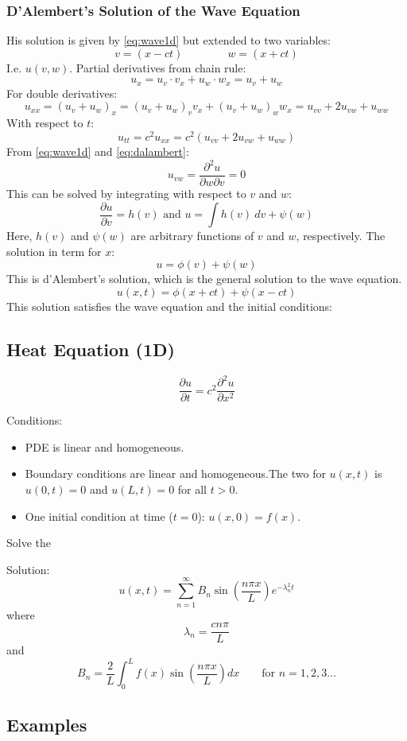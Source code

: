 \subsubsection{D’Alembert’s Solution of the Wave Equation}
His solution is given by \cref{eq:wave1d} but extended to two variables:
\begin{equation}
  v=(x-ct) \quad\quad\quad\quad w=(x+ct)
  \label{eq:dalambert}
\end{equation}
I.e. $u(v,w)$. Partial derivatives from chain rule:
\[
  u_x=u_v \cdot v_x+u_w\cdot w_x=u_v+u_w
\]
For double derivatives:
\[
  u_{xx}=(u_v+u_w)_x=(u_v+u_w)_v v_x+(u_v+u_w)_w w_x=u_{vv}+2u_{vw}+u_{ww}
\]
With respect to $t$:
\[
  u_{tt}=c^2u_{xx}=c^2(u_{vv}+2u_{vw}+u_{ww})
\]
From \cref{eq:wave1d} and \cref{eq:dalambert}:
\[
  u_{vw}=\frac{\partial^2u}{\partial w \partial v}=0
\]
This can be solved by integrating with respect to $v$ and $w$:
\[
  \frac{\partial u}{\partial v}=h(v) \text{ and } u=\int h(v)\ dv + \psi(w)
\]
Here, $h(v)$ and $\psi(w)$ are arbitrary functions of $v$ and $w$, respectively.
The solution in term for $x$:
\[
  u=\phi(v)+\psi(w)
\]
This is d'Alembert's solution, which is the general solution to the wave equation.
\[
  u(x,t)=\phi(x+ct)+\psi(x-ct)
\]
This solution satisfies the wave equation and the initial conditions:




\subsection{Heat Equation (1D)}
\begin{equation}
  \frac{\partial u}{\partial t}=c^2\frac{\partial^2 u}{\partial x^2}
  \label{eq:Heat1D}
\end{equation}

Conditions:
\begin{itemize}
  \item PDE is linear and homogeneous.
  \item Boundary conditions are linear and homogeneous.The two for $u(x,t)$ is $u(0,t)=0$ and $u(L,t)=0$ for all $t>0$.
  \item One initial condition at time ($t=0$): $u(x,0)=f(x)$.
\end{itemize}
Solve the 

Solution:
$$u(x,t)=\sum_{n=1}^{\infty}B_n\sin\left(\frac{n\pi x}{L}\right)e^{-\lambda_n^2t}$$
where
$$\lambda_n = \frac{cn\pi}{L}$$
and
$$B_n = \frac{2}{L}\int_0^Lf(x)\sin\left(\frac{n\pi x}{L}\right)dx\quad\quad \text{for }n=1,2,3\dots$$
\subsection{Examples}
\subsubsection{}

